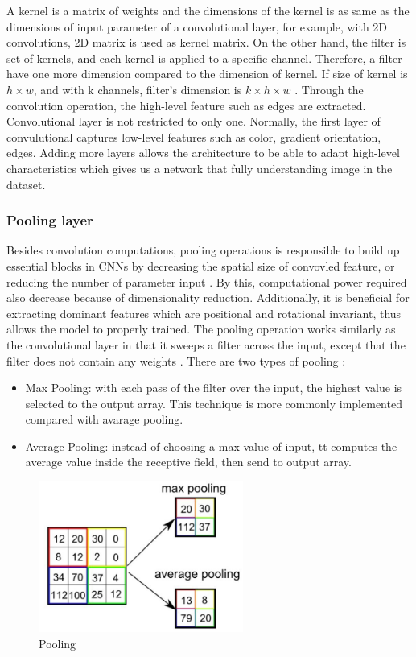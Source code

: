 \documentclass[a4paper, 12pt]{article}
\begin{document}
A kernel is a matrix of weights and the dimensions of the kernel is as same as the dimensions of input parameter of a convolutional layer, for example, with 2D convolutions, 2D matrix is used as kernel matrix. On the other hand, the filter is set of kernels, and each kernel is applied to a specific channel. Therefore, a filter have one more dimension compared to the dimension of kernel. If size of kernel is $h \times w$, and with k channels, filter's dimension is $k \times h \times w$ \citep{albawi2017understanding}. Through the convolution operation, the high-level feature such as edges are extracted. Convolutional layer is not restricted to only one. Normally, the first layer of convulutional captures low-level features such as color, gradient orientation, edges. Adding more layers allows the architecture to be able to adapt high-level characteristics which gives us a network that fully understanding image in the dataset.

\subsubsection{Pooling layer}
Besides convolution computations, pooling operations is responsible to build up essential blocks in CNNs by decreasing the spatial size of convovled feature, or reducing the number of parameter input \citep{dumoulin2016guide}. By this, computational power required also decrease because of dimensionality reduction. Additionally, it is beneficial for extracting dominant features which are positional and rotational invariant, thus allows the model to properly trained. The pooling operation works similarly as the convolutional layer in that it sweeps a filter across the input, except that the filter does not contain any weights \citep{albawi2017understanding}. There are two types of pooling \citep{ibmConvNet}:

\begin{itemize}
    \item Max Pooling: with each pass of the filter over the input, the highest value is selected to the output array. This technique is more commonly implemented compared with avarage pooling.
    \item Average Pooling: instead of choosing a max value of input, tt computes the average value inside the receptive field, then send to output array.
\end{itemize}

\begin{figure}
    \centering
    \includegraphics[width=0.6\textwidth]{Pooling.png}
    \caption{Pooling}
    \label{Figure}
\end{figure}
\end{document}
